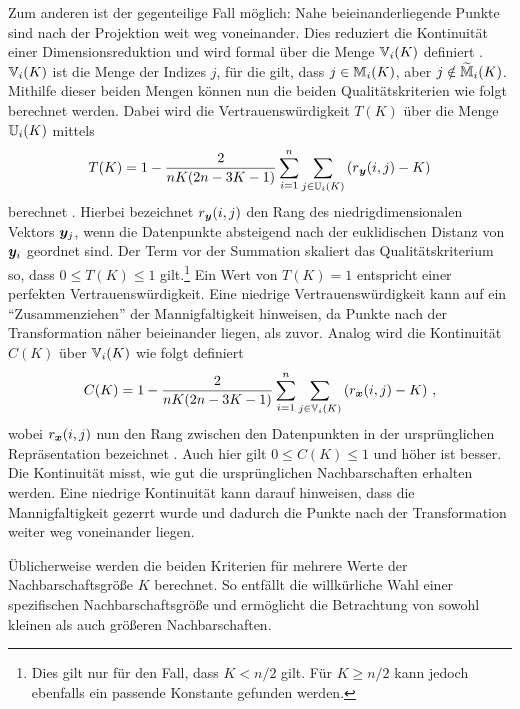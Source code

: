 Zum anderen ist der gegenteilige Fall möglich: Nahe beieinanderliegende Punkte sind nach der
Projektion weit weg voneinander. Dies reduziert die Kontinuität einer Dimensionsreduktion und wird
formal über die Menge $\mathbb{V}_i(K)$
definiert \parencite[487]{Venna.2001}. $\mathbb{V}_i(K)$ ist die Menge der Indizes $j$, für die gilt, dass $j \in
	\mathbb{M}_i(K)$, aber $j \notin \widetilde{\mathbb{M}}_i(K)$. Mithilfe dieser beiden Mengen können nun
die beiden Qualitätskriterien wie folgt berechnet werden. Dabei wird die Vertrauenswürdigkeit
$T(K)$ über die Menge $\mathbb{U}_i(K)$ mittels
\begin{equation}
	T(K) = 1 - \frac{2}{nK(2n - 3K - 1)} \sum_{i = 1}^{n}\sum_{j \in \set{U}_i(K) } \left( r­_{\vect{y}}(i, j) - K \right)
\end{equation}
berechnet \parencite[487]{Venna.2001}. Hierbei bezeichnet $r_{\bm{y}}(i, j)$ den Rang des niedrigdimensionalen
Vektors $\bm{y}_j$, wenn die Datenpunkte absteigend nach der euklidischen Distanz von
$\bm{y}_i$ geordnet sind. Der Term vor der Summation skaliert das Qualitätskriterium so, dass $0
	\leq T(K) \leq 1$ gilt.\footnote{Dies gilt nur für den Fall, dass $K < n/2$ gilt. Für $K \geq n/2$
	kann jedoch ebenfalls ein passende Konstante gefunden werden.} Ein Wert von $T(K) = 1­$ entspricht
einer perfekten Vertrauenswürdigkeit. Eine niedrige Vertrauenswürdigkeit kann auf ein
\enquote{Zusammenziehen} der Mannigfaltigkeit hinweisen, da Punkte nach der Transformation näher
beieinander liegen, als zuvor. Analog wird die Kontinuität $C(K)$ über $\mathbb{V}_i(K)$ wie folgt
definiert
\begin{equation}
	C(K) = 1 - \frac{2}{nK(2n - 3K - 1)} \sum_{i = 1}^{n}\sum_{j \in \mathbb{V}_i(K) } \left( r_{\bm{x}}(i, j) - K \right) \, ,
\end{equation}
wobei $r_{\bm{x}}(i, j)$ nun den Rang zwischen den Datenpunkten in der ursprünglichen Repräsentation bezeichnet \parencite[487]{Venna.2001}. Auch hier gilt $0 \leq C(K) \leq 1$ und höher ist besser. Die Kontinuität
misst, wie gut die ursprünglichen Nachbarschaften erhalten werden. Eine niedrige Kontinuität kann
darauf hinweisen, dass die Mannigfaltigkeit gezerrt wurde und dadurch die Punkte nach der
Transformation weiter weg voneinander liegen.

Üblicherweise werden die beiden Kriterien für mehrere Werte der Nachbarschaftsgröße $K$ berechnet. So entfällt die willkürliche Wahl einer spezifischen Nachbarschaftsgröße und ermöglicht die Betrachtung von sowohl kleinen als auch größeren Nachbarschaften.


